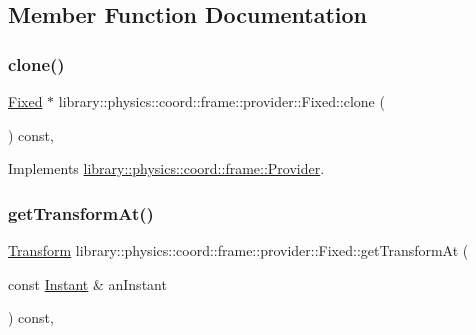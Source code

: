 \subsection{Member Function Documentation}
\mbox{\label{classlibrary_1_1physics_1_1coord_1_1frame_1_1provider_1_1_fixed_aa042b90216dd5276ffca2054c93dfc6e}} 
\subsubsection{\texorpdfstring{clone()}{clone()}}
{\footnotesize\ttfamily \hyperlink{classlibrary_1_1physics_1_1coord_1_1frame_1_1provider_1_1_fixed}{Fixed} $\ast$ library\+::physics\+::coord\+::frame\+::provider\+::\+Fixed\+::clone (\begin{DoxyParamCaption}{ }\end{DoxyParamCaption}) const\hspace{0.3cm}{\ttfamily [override]}, {\ttfamily [virtual]}}



Implements \hyperlink{classlibrary_1_1physics_1_1coord_1_1frame_1_1_provider_ab8eee40c8ef4aee0b57bedf458f4934e}{library\+::physics\+::coord\+::frame\+::\+Provider}.

\mbox{\label{classlibrary_1_1physics_1_1coord_1_1frame_1_1provider_1_1_fixed_aa5c6299ec0344dbdfb94389b3d7adec5}} 
\subsubsection{\texorpdfstring{get\+Transform\+At()}{getTransformAt()}}
{\footnotesize\ttfamily \hyperlink{classlibrary_1_1physics_1_1coord_1_1_transform}{Transform} library\+::physics\+::coord\+::frame\+::provider\+::\+Fixed\+::get\+Transform\+At (\begin{DoxyParamCaption}\item[{const \hyperlink{classlibrary_1_1physics_1_1time_1_1_instant}{Instant} \&}]{an\+Instant }\end{DoxyParamCaption}) const\hspace{0.3cm}{\ttfamily [override]}, {\ttfamily [virtual]}}



